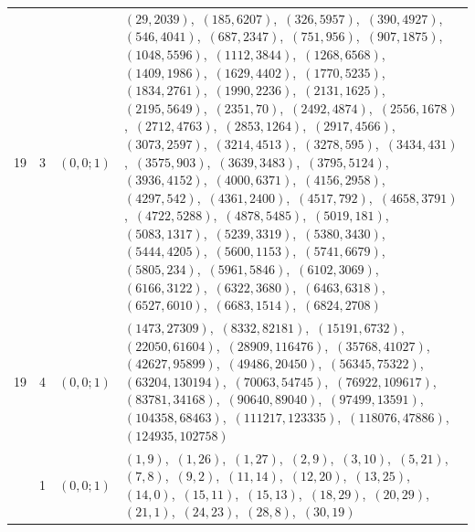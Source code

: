 \documentclass[11pt]{article}
\begin{document}
\begin{longtable}{@{}rrl>{\raggedright\arraybackslash}p{}@{}}
19 & 3 & $(0,0;1)$ & $(29,2039)$,\allowbreak\ $(185,6207)$,\allowbreak\ $(326,5957)$,\allowbreak\ $(390,4927)$,\allowbreak\ $(546,4041)$,\allowbreak\ $(687,2347)$,\allowbreak\ $(751,956)$,\allowbreak\ $(907,1875)$,\allowbreak\ $(1048,5596)$,\allowbreak\ $(1112,3844)$,\allowbreak\ $(1268,6568)$,\allowbreak\ $(1409,1986)$,\allowbreak\ $(1629,4402)$,\allowbreak\ $(1770,5235)$,\allowbreak\ $(1834,2761)$,\allowbreak\ $(1990,2236)$,\allowbreak\ $(2131,1625)$,\allowbreak\ $(2195,5649)$,\allowbreak\ $(2351,70)$,\allowbreak\ $(2492,4874)$,\allowbreak\ $(2556,1678)$,\allowbreak\ $(2712,4763)$,\allowbreak\ $(2853,1264)$,\allowbreak\ $(2917,4566)$,\allowbreak\ $(3073,2597)$,\allowbreak\ $(3214,4513)$,\allowbreak\ $(3278,595)$,\allowbreak\ $(3434,431)$,\allowbreak\ $(3575,903)$,\allowbreak\ $(3639,3483)$,\allowbreak\ $(3795,5124)$,\allowbreak\ $(3936,4152)$,\allowbreak\ $(4000,6371)$,\allowbreak\ $(4156,2958)$,\allowbreak\ $(4297,542)$,\allowbreak\ $(4361,2400)$,\allowbreak\ $(4517,792)$,\allowbreak\ $(4658,3791)$,\allowbreak\ $(4722,5288)$,\allowbreak\ $(4878,5485)$,\allowbreak\ $(5019,181)$,\allowbreak\ $(5083,1317)$,\allowbreak\ $(5239,3319)$,\allowbreak\ $(5380,3430)$,\allowbreak\ $(5444,4205)$,\allowbreak\ $(5600,1153)$,\allowbreak\ $(5741,6679)$,\allowbreak\ $(5805,234)$,\allowbreak\ $(5961,5846)$,\allowbreak\ $(6102,3069)$,\allowbreak\ $(6166,3122)$,\allowbreak\ $(6322,3680)$,\allowbreak\ $(6463,6318)$,\allowbreak\ $(6527,6010)$,\allowbreak\ $(6683,1514)$,\allowbreak\ $(6824,2708)$\\
19 & 4 & $(0,0;1)$ & $(1473,27309)$,\allowbreak\ $(8332,82181)$,\allowbreak\ $(15191,6732)$,\allowbreak\ $(22050,61604)$,\allowbreak\ $(28909,116476)$,\allowbreak\ $(35768,41027)$,\allowbreak\ $(42627,95899)$,\allowbreak\ $(49486,20450)$,\allowbreak\ $(56345,75322)$,\allowbreak\ $(63204,130194)$,\allowbreak\ $(70063,54745)$,\allowbreak\ $(76922,109617)$,\allowbreak\ $(83781,34168)$,\allowbreak\ $(90640,89040)$,\allowbreak\ $(97499,13591)$,\allowbreak\ $(104358,68463)$,\allowbreak\ $(111217,123335)$,\allowbreak\ $(118076,47886)$,\allowbreak\ $(124935,102758)$\\
\addlinespace[3pt]
31 & 1 & $(0,0;1)$ & $(1,9)$,\allowbreak\ $(1,26)$,\allowbreak\ $(1,27)$,\allowbreak\ $(2,9)$,\allowbreak\ $(3,10)$,\allowbreak\ $(5,21)$,\allowbreak\ $(7,8)$,\allowbreak\ $(9,2)$,\allowbreak\ $(11,14)$,\allowbreak\ $(12,20)$,\allowbreak\ $(13,25)$,\allowbreak\ $(14,0)$,\allowbreak\ $(15,11)$,\allowbreak\ $(15,13)$,\allowbreak\ $(18,29)$,\allowbreak\ $(20,29)$,\allowbreak\ $(21,1)$,\allowbreak\ $(24,23)$,\allowbreak\ $(28,8)$,\allowbreak\ $(30,19)$\\

\end{longtable}
\end{document}
